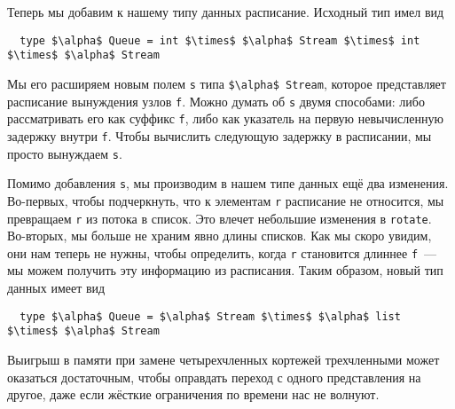 Теперь мы добавим к нашему типу данных расписание. Исходный тип имел
вид
\begin{lstlisting}
  type $\alpha$ Queue = int $\times$ $\alpha$ Stream $\times$ int $\times$ $\alpha$ Stream
\end{lstlisting}
Мы его расширяем новым полем \lstinline!s! типа \lstinline!$\alpha$ Stream!, которое
представляет расписание вынуждения узлов \lstinline!f!. Можно думать об \lstinline!s!
двумя способами: либо рассматривать его как суффикс \lstinline!f!,
либо как указатель на первую невычисленную задержку внутри
\lstinline!f!. Чтобы вычислить следующую задержку в расписании, мы
просто вынуждаем \lstinline!s!.

Помимо добавления \lstinline!s!, мы производим в нашем типе данных ещё
два изменения.  Во-первых, чтобы подчеркнуть, что к элементам
\lstinline!r! расписание не относится, мы превращаем \lstinline!r! из
потока в список. Это влечет небольшие изменения в
\lstinline!rotate!. Во-вторых, мы больше не храним явно длины
списков. Как мы скоро увидим, они нам теперь не нужны, чтобы
определить, когда \lstinline!r! становится длиннее \lstinline!f!~---
мы можем получить эту информацию из расписания. Таким образом, новый
тип данных имеет вид
\begin{lstlisting}
  type $\alpha$ Queue = $\alpha$ Stream $\times$ $\alpha$ list $\times$ $\alpha$ Stream
\end{lstlisting}
\begin{remark}
  Выигрыш в памяти при замене четырехчленных кортежей трехчленными
  может оказаться достаточным, чтобы оправдать переход с одного
  представления на другое, даже если жёсткие ограничения по времени
  нас не волнуют.
\end{remark}

